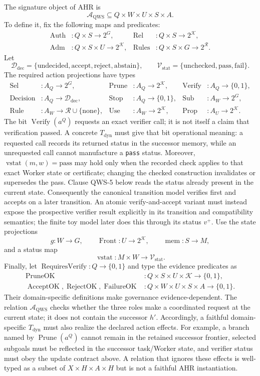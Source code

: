 \documentclass[11pt,oneside]{book}
\theoremstyle{remark}
\newcommand{\AQWS}{\mathcal A_{\mathrm{QWS}}}
\DeclareMathOperator{\Auth}{Auth}
\DeclareMathOperator{\Rel}{Rel}
\DeclareMathOperator{\Adm}{Adm}
\DeclareMathOperator{\Rules}{Rules}
\DeclareMathOperator{\Front}{Front}
\DeclareMathOperator{\Prop}{Prop}
\DeclareMathOperator{\Prune}{Prune}
\DeclareMathOperator{\Use}{Use}
\DeclareMathOperator{\Rule}{Rule}
\DeclareMathOperator{\Sel}{Sel}
\DeclareMathOperator{\Decision}{Decision}
\DeclareMathOperator{\Stop}{Stop}
\DeclareMathOperator{\Verify}{Verify}
\DeclareMathOperator{\vstat}{vstat}
\begin{document}
The signature object of AHR is
\[
\AQWS\subseteq Q\times W\times U\times S\times A.
\]
To define it, fix the following maps and predicates:
\begin{align*}
\Auth &:Q\times S\to2^G, &
\Rel &:Q\times S\to2^{\mathcal K},\\
\Adm &:Q\times S\times U\to2^{\mathcal K}, &
\Rules &:Q\times S\times G\to2^{\mathcal R}.
\end{align*}
Let
\[
\mathcal D_{\mathrm{dec}}
=\{\mathrm{undecided},\mathrm{accept},\mathrm{reject},\mathrm{abstain}\},
\qquad
\mathcal V_{\mathrm{stat}}
=\{\mathrm{unchecked},\mathrm{pass},\mathrm{fail}\}.
\]
The required action projections have types
\begin{align*}
\Sel&:A_Q\to2^G,&
\Prune&:A_Q\to2^{\mathcal K},&
\Verify&:A_Q\to\{0,1\},\\
\Decision&:A_Q\to\mathcal D_{\mathrm{dec}},&
\Stop&:A_Q\to\{0,1\},&
\operatorname{Sub}&:A_W\to2^G,\\
\Rule&:A_W\to\mathcal R\cup\{\mathrm{none}\},&
\Use&:A_W\to2^{\mathcal K},&
\Prop&:A_U\to2^{\mathcal K}.
\end{align*}
The bit $\Verify(a^Q)$ requests an exact verifier call; it is not itself a
claim that verification passed. A concrete $T_{\mathrm{dyn}}$ must give that
bit operational meaning: a requested call records its returned status in the
successor memory, while an unrequested call cannot manufacture a
\texttt{pass} status. Moreover, $\vstat(m,w)=\mathrm{pass}$ may hold only
when the recorded check applies to that exact Worker state or certificate;
changing the checked construction invalidates or supersedes the pass. Clause
QWS-5 below reads the status already present in the current state.
Consequently the canonical transition model verifies first and accepts on a
later transition. An atomic verify-and-accept variant must instead expose the
prospective verifier result explicitly in its transition and compatibility
semantics; the finite toy model later does this through its status $v^+$.
Use the state projections
\[
\widehat g:W\to G,\qquad
\Front:U\to2^{\mathcal K},\qquad
\operatorname{mem}:S\to M,
\]
and a status map
\[
\vstat:M\times W\to\mathcal V_{\mathrm{stat}}.
\]
Finally, let $\operatorname{RequiresVerify}:Q\to\{0,1\}$ and type the evidence
predicates as
\begin{align*}
\operatorname{PruneOK}&:Q\times S\times U\times\mathcal K\to\{0,1\},\\
\operatorname{AcceptOK},\operatorname{RejectOK},
\operatorname{FailureOK}
&:Q\times W\times U\times S\times A\to\{0,1\}.
\end{align*}
Their domain-specific definitions make governance evidence-dependent.
The relation $\AQWS$ checks whether the three roles make a coordinated
request at the current state; it does not contain the successor $h'$.
Accordingly, a faithful domain-specific $T_{\mathrm{dyn}}$ must also realize
the declared action effects. For example, a branch named by $\Prune(a^Q)$
cannot remain in the retained successor frontier, selected subgoals must be
reflected in the successor task/Worker state, and verifier status must obey
the update contract above. A relation that ignores these effects is
well-typed as a subset of $X\times H\times A\times H$ but is not a faithful
AHR instantiation.
\end{document}

